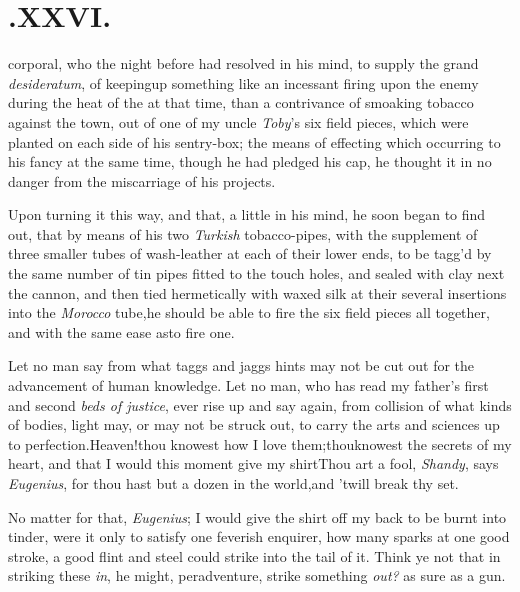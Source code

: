 \documentclass{article}
\begin{document}
\section{.\enspace XXVI.}

 corporal, who the night before
had resolved in his mind, to\break
supply the grand \textit{desideratum}, of keeping\break up something like an incessant
firing upon the enemy during the heat of the  at that time, than a contrivance of smoaking tobacco against the town, out of
one of my uncle \textit{Toby}’s six field pieces, which were planted on each side of
his\break
sentry-box; the means of effecting which\break
occurring to his fancy at the same time,\break
though he had pledged his cap, he thought it in no danger from the miscarriage
of his projects.

Upon turning it this way, and that, a little in his mind, he
soon began to find out, that by means of his two \textit{Tur\-kish}
tobacco-pipes, with the supplement of three smaller tubes of
wash-leather at each of their lower ends, to be tagg’d by the
same number of tin pipes fitted to the touch holes, and sealed with
clay next the cannon, and then tied herme\-tically with waxed silk at
their several insertions into the \textit{Morocco} tube,\tsk he
should be able to fire the six field pieces all together, and with
the same ease as\break to fire one.\tsh 

\etpp
\tsh Let no man say from what taggs and jaggs hints may
not be cut out for the advancement of human knowledge. Let no man, who
has read my father’s first and second \textit{beds of justice},
ever rise up and say again, from collision of what kinds of bodies,
light may, or may not be struck out, to carry the arts and sciences
up to perfection.\tsh Heaven!\break thou knowest how I love
them;\tsk thou\break knowest the secrets of my heart, and that I
would this moment give my shirt\break\tsh Thou art a fool,
\textit{Shandy}, says \textit{Eu\-genius}, for thou hast but a dozen in
the world,\tsk and ’twill break thy set.\tsh

No matter for that, \textit{Eugenius}; I would give the shirt off
my back to be burnt into tinder, were it only to satisfy one
feverish enquirer, how many sparks at one good stroke, a good flint
and steel could strike into the tail of it.\tsh\break
Think ye not that in striking these \textit{in},\tsk\break
he might, peradventure, strike something \textit{out?} as sure as a
gun.\tsh
\end{document}
